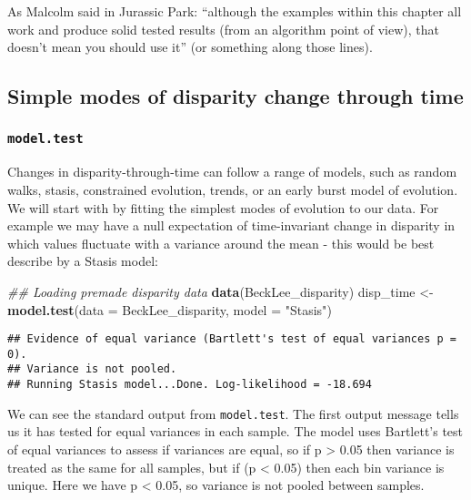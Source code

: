 \documentclass[
]{book}
\newenvironment{Shaded}{\begin{snugshade}}{\end{snugshade}}
\newcommand{\CommentTok}[1]{\textcolor[rgb]{0.56,0.35,0.01}{\textit{#1}}}
\newcommand{\DataTypeTok}[1]{\textcolor[rgb]{0.13,0.29,0.53}{#1}}
\newcommand{\KeywordTok}[1]{\textcolor[rgb]{0.13,0.29,0.53}{\textbf{#1}}}
\newcommand{\NormalTok}[1]{#1}
\newcommand{\StringTok}[1]{\textcolor[rgb]{0.31,0.60,0.02}{#1}}
\begin{document}
As Malcolm said in Jurassic Park: ``although the examples within this chapter all work and produce solid tested results (from an algorithm point of view), that doesn't mean you should use it'' (or something along those lines).

\hypertarget{simple-modes-of-disparity-change-through-time}{%
\subsection{Simple modes of disparity change through time}\label{simple-modes-of-disparity-change-through-time}}

\hypertarget{model.test}{%
\subsubsection{\texorpdfstring{\texttt{model.test}}{model.test}}\label{model.test}}

Changes in disparity-through-time can follow a range of models, such as random walks, stasis, constrained evolution, trends, or an early burst model of evolution.
We will start with by fitting the simplest modes of evolution to our data.
For example we may have a null expectation of time-invariant change in disparity in which values fluctuate with a variance around the mean - this would be best describe by a Stasis model:

\begin{Shaded}
\begin{Highlighting}[]
\CommentTok{\#\# Loading premade disparity data}
\KeywordTok{data}\NormalTok{(BeckLee\_disparity)}
\NormalTok{disp\_time \textless{}{-}}\StringTok{ }\KeywordTok{model.test}\NormalTok{(}\DataTypeTok{data =}\NormalTok{ BeckLee\_disparity, }\DataTypeTok{model =} \StringTok{"Stasis"}\NormalTok{)}
\end{Highlighting}
\end{Shaded}

\begin{verbatim}
## Evidence of equal variance (Bartlett's test of equal variances p = 0).
## Variance is not pooled.
## Running Stasis model...Done. Log-likelihood = -18.694
\end{verbatim}

We can see the standard output from \texttt{model.test}.
The first output message tells us it has tested for equal variances in each sample.
The model uses Bartlett's test of equal variances to assess if variances are equal, so if p \textgreater{} 0.05 then variance is treated as the same for all samples, but if (p \textless{} 0.05) then each bin variance is unique.
Here we have p \textless{} 0.05, so variance is not pooled between samples.
\end{document}
